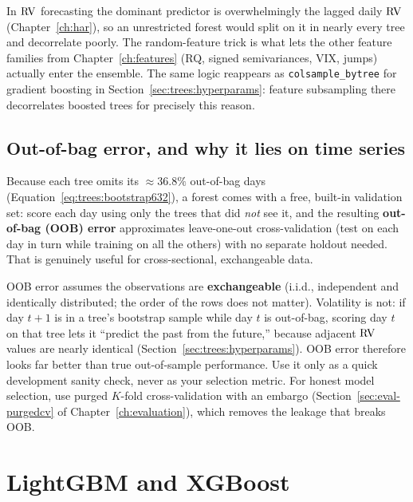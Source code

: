 \begin{projectconnection}
In $\operatorname{RV}$ forecasting the dominant predictor is overwhelmingly the lagged
daily $\operatorname{RV}$ (Chapter~\ref{ch:har}), so an unrestricted forest would split on
it in nearly every tree and decorrelate poorly.  The random-feature trick is
what lets the other feature families from Chapter~\ref{ch:features} (RQ,
signed semivariances, VIX, jumps) actually enter the ensemble.  The same
logic reappears as \texttt{colsample\_bytree} for gradient boosting in
Section~\ref{sec:trees:hyperparams}: feature subsampling there decorrelates
boosted trees for precisely this reason.
\end{projectconnection}

\subsection{Out-of-bag error, and why it lies on time series}

Because each tree omits its $\approx 36.8\%$ out-of-bag days
(Equation~\ref{eq:trees:bootstrap632}), a forest comes with a free,
built-in validation set: score each day using only the trees that did
\emph{not} see it, and the resulting \textbf{out-of-bag (OOB) error}
approximates leave-one-out cross-validation (test on each day in turn while
training on all the others) with no separate holdout needed.
That is genuinely useful for cross-sectional, exchangeable data.

\begin{warning}
OOB error assumes the observations are \textbf{exchangeable}
(i.i.d., independent and identically distributed; the order of the rows
does not matter).
Volatility is not: if day $t{+}1$ is in a tree's bootstrap sample while day
$t$ is out-of-bag, scoring day $t$ on that tree lets it ``predict the past
from the future,'' because adjacent $\operatorname{RV}$ values are nearly identical
(Section~\ref{sec:trees:hyperparams}).  OOB error therefore looks far better
than true out-of-sample performance.  Use it only as a quick development
sanity check, never as your selection metric.  For honest model selection,
use purged $K$-fold cross-validation with an embargo
(Section~\ref{sec:eval-purgedcv} of Chapter~\ref{ch:evaluation}), which
removes the leakage that breaks OOB.
\end{warning}



\section{LightGBM and XGBoost}\label{sec:trees:gbm}


